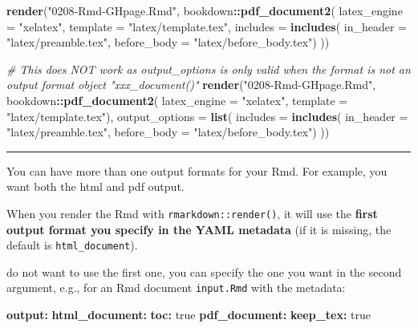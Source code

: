 \documentclass[
  a4paper,
  twoside,
  openright]{book}
\newenvironment{Shaded}{\begin{snugshade}}{\end{snugshade}}
\newcommand{\AttributeTok}[1]{\textcolor[rgb]{0.13,0.29,0.53}{#1}}
\newcommand{\CharTok}[1]{\textcolor[rgb]{0.31,0.60,0.02}{#1}}
\newcommand{\CommentTok}[1]{\textcolor[rgb]{0.56,0.35,0.01}{\textit{#1}}}
\newcommand{\FunctionTok}[1]{\textcolor[rgb]{0.13,0.29,0.53}{\textbf{#1}}}
\newcommand{\KeywordTok}[1]{\textcolor[rgb]{0.13,0.29,0.53}{\textbf{#1}}}
\newcommand{\NormalTok}[1]{#1}
\newcommand{\SpecialCharTok}[1]{\textcolor[rgb]{0.81,0.36,0.00}{\textbf{#1}}}
\newcommand{\StringTok}[1]{\textcolor[rgb]{0.31,0.60,0.02}{#1}}
\theoremstyle{definition}
\theoremstyle{definition}
\theoremstyle{definition}
\theoremstyle{definition}
\theoremstyle{remark}
\begin{document}
\begin{Shaded}
\begin{Highlighting}[]
\FunctionTok{render}\NormalTok{(}\StringTok{"0208{-}Rmd{-}GHpage.Rmd"}\NormalTok{, }
\NormalTok{    bookdown}\SpecialCharTok{::}\FunctionTok{pdf\_document2}\NormalTok{(}
        \AttributeTok{latex\_engine =} \StringTok{"xelatex"}\NormalTok{,}
        \AttributeTok{template =} \StringTok{"latex/template.tex"}\NormalTok{,}
        \AttributeTok{includes =} \FunctionTok{includes}\NormalTok{(}
            \AttributeTok{in\_header =} \StringTok{"latex/preamble.tex"}\NormalTok{,}
            \AttributeTok{before\_body =} \StringTok{"latex/before\_body.tex"}\NormalTok{)}
\NormalTok{        ))}

\CommentTok{\# This does NOT work as \textasciigrave{}output\_options\textasciigrave{} is only valid when the format is not an output format object "xxx\_document()"}
\FunctionTok{render}\NormalTok{(}\StringTok{"0208{-}Rmd{-}GHpage.Rmd"}\NormalTok{, }
\NormalTok{    bookdown}\SpecialCharTok{::}\FunctionTok{pdf\_document2}\NormalTok{(}
        \AttributeTok{latex\_engine =} \StringTok{"xelatex"}\NormalTok{,}
        \AttributeTok{template =} \StringTok{"latex/template.tex"}\NormalTok{), }
    \AttributeTok{output\_options =} \FunctionTok{list}\NormalTok{(}
        \AttributeTok{includes =} \FunctionTok{includes}\NormalTok{(}
            \AttributeTok{in\_header =} \StringTok{"latex/preamble.tex"}\NormalTok{,}
            \AttributeTok{before\_body =} \StringTok{"latex/before\_body.tex"}\NormalTok{)}
\NormalTok{        ))}
\end{Highlighting}
\end{Shaded}

\begin{center}\rule{0.5\linewidth}{0.5pt}\end{center}

You can have more than one output formats for your Rmd. For example, you want both the html and pdf output.

When you render the Rmd with \texttt{rmarkdown::render()}, it will use the \textbf{first output format you specify in the YAML metadata} (if it is missing, the default is \texttt{html\_document}).

do not want to use the first one, you can specify the one you want in the second argument, e.g., for an Rmd document \texttt{input.Rmd} with the metadata:

\begin{Shaded}
\begin{Highlighting}[]
\FunctionTok{output}\KeywordTok{:}
\AttributeTok{  }\FunctionTok{html\_document}\KeywordTok{:}
\AttributeTok{    }\FunctionTok{toc}\KeywordTok{:}\AttributeTok{ }\CharTok{true}
\AttributeTok{  }\FunctionTok{pdf\_document}\KeywordTok{:}
\AttributeTok{    }\FunctionTok{keep\_tex}\KeywordTok{:}\AttributeTok{ }\CharTok{true}
\end{Highlighting}
\end{Shaded}
\end{document}
